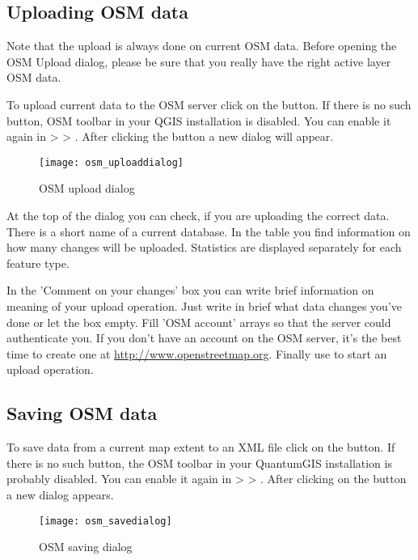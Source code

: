 \subsection{Uploading OSM data}  

Note that the upload is always done on current OSM data. Before opening the 
OSM Upload dialog, please be sure that you really have the right active 
layer ~ OSM data.

To upload current data to the OSM server click on the 
 button. If there is no such button, 
OSM toolbar in your QGIS installation is disabled. You can enable it 
again in  >  > 
. After clicking the  button a 
new dialog will appear.

\begin{figure}[ht]
   \centering
   \caption{OSM upload dialog \nixcaption}\label{fig:osmupload}\smallskip
   \texttt{[image: osm\_uploaddialog]}
\end{figure}

At the top of the dialog you can check, if you are uploading the correct data. 
There is a short name of a current database. In the table you find information 
on how many changes will be uploaded. Statistics are displayed separately 
for each feature type.

In the 'Comment on your changes' box you can write brief information on 
meaning of your upload operation. Just write in brief what data changes 
you've done or let the box empty.
Fill 'OSM account' arrays so that the server could authenticate you. If 
you don't have an account on the OSM server, it's the best time to create 
one at \url{http://www.openstreetmap.org}. Finally use  to 
start an upload operation.

\subsection{Saving OSM data}  

To save data from a current map extent to an XML file click on the
 button. If there is no such button, 
the OSM toolbar in your QuantumGIS installation is probably disabled. You can 
enable it again in  >  >
. After clicking on the button a new dialog appears.

\begin{figure}[ht]
   \centering
   \caption{OSM saving dialog \nixcaption}\label{fig:osmsave}\smallskip
   \texttt{[image: osm\_savedialog]}
\end{figure}

